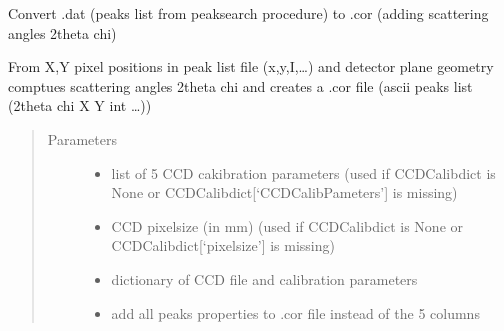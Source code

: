 \documentclass[letterpaper,10pt,english]{sphinxmanual}
\begin{document}
\begin{fulllineitems}
\label{\detokenize{Simulation_Module:LaueTools.LaueGeometry.convert2corfile}}
Convert .dat (peaks list from peaksearch procedure) to .cor (adding scattering angles 2theta chi)

From X,Y pixel positions in peak list file (x,y,I,…) and detector plane geometry comptues scattering angles 2theta chi
and creates a .cor file (ascii peaks list (2theta chi X Y int …))
\begin{quote}\begin{description}
\item[{Parameters}] \leavevmode\begin{itemize}
\item {} 
 \textendash{} list of 5 CCD cakibration parameters (used if CCDCalibdict is None or  CCDCalibdict{[}‘CCDCalibPameters’{]} is missing)

\item {} 
 \textendash{} CCD pixelsize (in mm) (used if CCDCalibdict is None or CCDCalibdict{[}‘pixelsize’{]} is missing)

\item {} 
 \textendash{} dictionary of CCD file and calibration parameters

\item {} 
 \textendash{} add all peaks properties to .cor file instead of the 5 columns

\end{itemize}

\end{description}\end{quote}

\end{fulllineitems}

\end{document}
